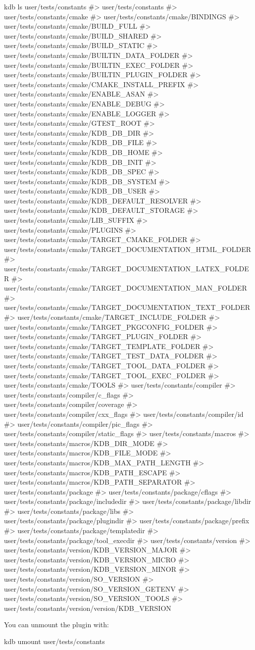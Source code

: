 \begin{DoxyCode}
kdb ls user/tests/constants
#> user/tests/constants
#> user/tests/constants/cmake
#> user/tests/constants/cmake/BINDINGS
#> user/tests/constants/cmake/BUILD\_FULL
#> user/tests/constants/cmake/BUILD\_SHARED
#> user/tests/constants/cmake/BUILD\_STATIC
#> user/tests/constants/cmake/BUILTIN\_DATA\_FOLDER
#> user/tests/constants/cmake/BUILTIN\_EXEC\_FOLDER
#> user/tests/constants/cmake/BUILTIN\_PLUGIN\_FOLDER
#> user/tests/constants/cmake/CMAKE\_INSTALL\_PREFIX
#> user/tests/constants/cmake/ENABLE\_ASAN
#> user/tests/constants/cmake/ENABLE\_DEBUG
#> user/tests/constants/cmake/ENABLE\_LOGGER
#> user/tests/constants/cmake/GTEST\_ROOT
#> user/tests/constants/cmake/KDB\_DB\_DIR
#> user/tests/constants/cmake/KDB\_DB\_FILE
#> user/tests/constants/cmake/KDB\_DB\_HOME
#> user/tests/constants/cmake/KDB\_DB\_INIT
#> user/tests/constants/cmake/KDB\_DB\_SPEC
#> user/tests/constants/cmake/KDB\_DB\_SYSTEM
#> user/tests/constants/cmake/KDB\_DB\_USER
#> user/tests/constants/cmake/KDB\_DEFAULT\_RESOLVER
#> user/tests/constants/cmake/KDB\_DEFAULT\_STORAGE
#> user/tests/constants/cmake/LIB\_SUFFIX
#> user/tests/constants/cmake/PLUGINS
#> user/tests/constants/cmake/TARGET\_CMAKE\_FOLDER
#> user/tests/constants/cmake/TARGET\_DOCUMENTATION\_HTML\_FOLDER
#> user/tests/constants/cmake/TARGET\_DOCUMENTATION\_LATEX\_FOLDER
#> user/tests/constants/cmake/TARGET\_DOCUMENTATION\_MAN\_FOLDER
#> user/tests/constants/cmake/TARGET\_DOCUMENTATION\_TEXT\_FOLDER
#> user/tests/constants/cmake/TARGET\_INCLUDE\_FOLDER
#> user/tests/constants/cmake/TARGET\_PKGCONFIG\_FOLDER
#> user/tests/constants/cmake/TARGET\_PLUGIN\_FOLDER
#> user/tests/constants/cmake/TARGET\_TEMPLATE\_FOLDER
#> user/tests/constants/cmake/TARGET\_TEST\_DATA\_FOLDER
#> user/tests/constants/cmake/TARGET\_TOOL\_DATA\_FOLDER
#> user/tests/constants/cmake/TARGET\_TOOL\_EXEC\_FOLDER
#> user/tests/constants/cmake/TOOLS
#> user/tests/constants/compiler
#> user/tests/constants/compiler/c\_flags
#> user/tests/constants/compiler/coverage
#> user/tests/constants/compiler/cxx\_flags
#> user/tests/constants/compiler/id
#> user/tests/constants/compiler/pic\_flags
#> user/tests/constants/compiler/static\_flags
#> user/tests/constants/macros
#> user/tests/constants/macros/KDB\_DIR\_MODE
#> user/tests/constants/macros/KDB\_FILE\_MODE
#> user/tests/constants/macros/KDB\_MAX\_PATH\_LENGTH
#> user/tests/constants/macros/KDB\_PATH\_ESCAPE
#> user/tests/constants/macros/KDB\_PATH\_SEPARATOR
#> user/tests/constants/package
#> user/tests/constants/package/cflags
#> user/tests/constants/package/includedir
#> user/tests/constants/package/libdir
#> user/tests/constants/package/libs
#> user/tests/constants/package/plugindir
#> user/tests/constants/package/prefix
#> user/tests/constants/package/templatedir
#> user/tests/constants/package/tool\_execdir
#> user/tests/constants/version
#> user/tests/constants/version/KDB\_VERSION\_MAJOR
#> user/tests/constants/version/KDB\_VERSION\_MICRO
#> user/tests/constants/version/KDB\_VERSION\_MINOR
#> user/tests/constants/version/SO\_VERSION
#> user/tests/constants/version/SO\_VERSION\_GETENV
#> user/tests/constants/version/SO\_VERSION\_TOOLS
#> user/tests/constants/version/version/KDB\_VERSION
\end{DoxyCode}


You can unmount the plugin with\+:


\begin{DoxyCode}
kdb umount user/tests/constants
\end{DoxyCode}
 